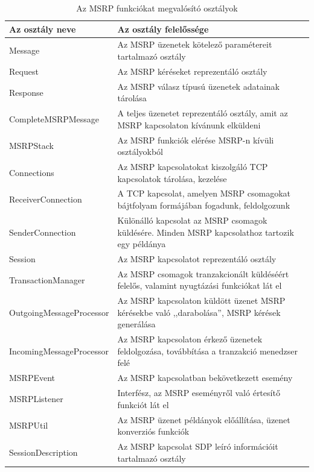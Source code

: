 \begin{table}[htb]
\center
\begin{tabular}{|l | p{9cm} |}
\hline
{\bf Az osztály neve} & {\bf Az osztály felelőssége}\\
\hline
\hline
Message & Az MSRP üzenetek kötelező paramétereit tartalmazó osztály\\ \hline
Request & Az MSRP kéréseket reprezentáló osztály\\ \hline
Response & Az MSRP válasz típusú üzenetek adatainak tárolása\\ \hline
CompleteMSRPMessage & A teljes üzenetet reprezentáló osztály, amit az MSRP kapcsolaton kívánunk elküldeni\\ \hline
MSRPStack & Az MSRP funkciók elérése MSRP-n kívüli osztályokból\\ \hline
Connections & Az MSRP kapcsolatokat kiszolgáló TCP kapcsolatok tárolása, kezelése\\ \hline
ReceiverConnection & A TCP kapcsolat, amelyen MSRP csomagokat bájtfolyam formájában fogadunk, feldolgozunk\\ \hline
SenderConnection & Különálló kapcsolat az MSRP csomagok küldésére. Minden MSRP kapcsolathoz tartozik egy példánya\\ \hline
Session & Az MSRP kapcsolatot reprezentáló osztály\\ \hline
TransactionManager & Az MSRP csomagok tranzakcionált küldéséért felelős, valamint nyugtázási funkciókat lát el\\ \hline
OutgoingMessageProcessor & Az MSRP kapcsolaton küldött üzenet MSRP kérésekbe való ,,darabolása'', MSRP kérések generálása\\ \hline
IncomingMessageProcessor & Az MSRP kapcsolaton érkező üzenetek feldolgozása, továbbítása a tranzakció menedzser felé\\ \hline
MSRPEvent & Az MSRP kapcsolatban bekövetkezett esemény\\ \hline
MSRPListener & Interfész, az MSRP eseményről való értesítő funkciót lát el\\ \hline
MSRPUtil & Az MSRP üzenet példányok előállítása, üzenet konverziós funkciók\\ \hline
SessionDescription & Az MSRP kapcsolat SDP leíró információit tartalmazó osztály\\ \hline
\hline
\end{tabular}
\caption{Az MSRP funkciókat megvalósító osztályok}
\label{tab:msrp_classes}
\end{table}

